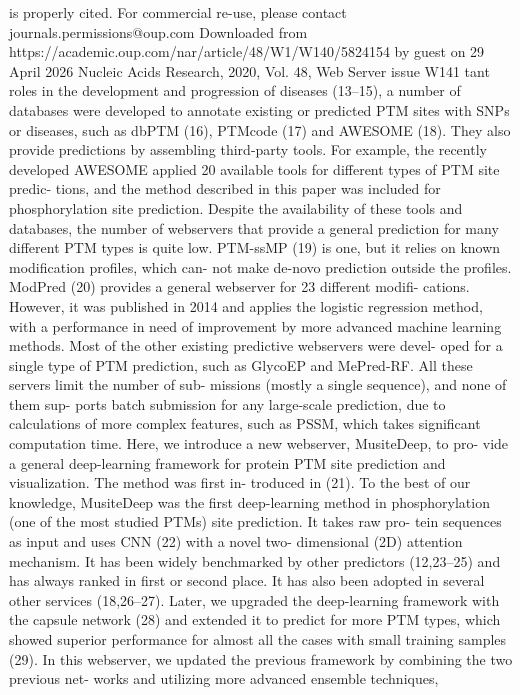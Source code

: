 is properly cited. For commercial re-use, please contact journals.permissions@oup.com
Downloaded from https://academic.oup.com/nar/article/48/W1/W140/5824154 by guest on 29 April 2026
Nucleic Acids Research, 2020, Vol. 48, Web Server issue W141
tant roles in the development and progression of diseases
(13–15), a number of databases were developed to annotate
existing or predicted PTM sites with SNPs or diseases, such
as dbPTM (16), PTMcode (17) and AWESOME (18). They
also provide predictions by assembling third-party tools.
For example, the recently developed AWESOME applied
20 available tools for different types of PTM site predic-
tions, and the method described in this paper was included
for phosphorylation site prediction.
Despite the availability of these tools and databases, the
number of webservers that provide a general prediction for
many different PTM types is quite low. PTM-ssMP (19) is
one, but it relies on known modification profiles, which can-
not make de-novo prediction outside the profiles. ModPred
(20) provides a general webserver for 23 different modifi-
cations. However, it was published in 2014 and applies the
logistic regression method, with a performance in need of
improvement by more advanced machine learning methods.
Most of the other existing predictive webservers were devel-
oped for a single type of PTM prediction, such as GlycoEP
and MePred-RF. All these servers limit the number of sub-
missions (mostly a single sequence), and none of them sup-
ports batch submission for any large-scale prediction, due
to calculations of more complex features, such as PSSM,
which takes significant computation time.
Here, we introduce a new webserver, MusiteDeep, to pro-
vide a general deep-learning framework for protein PTM
site prediction and visualization. The method was first in-
troduced in (21). To the best of our knowledge, MusiteDeep
was the first deep-learning method in phosphorylation (one
of the most studied PTMs) site prediction. It takes raw pro-
tein sequences as input and uses CNN (22) with a novel two-
dimensional (2D) attention mechanism. It has been widely
benchmarked by other predictors (12,23–25) and has always
ranked in first or second place. It has also been adopted
in several other services (18,26–27). Later, we upgraded the
deep-learning framework with the capsule network (28) and
extended it to predict for more PTM types, which showed
superior performance for almost all the cases with small
training samples (29). In this webserver, we updated the
previous framework by combining the two previous net-
works and utilizing more advanced ensemble techniques,
